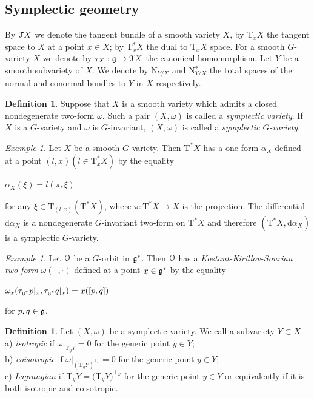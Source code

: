 \documentclass[12pt]{amsart}
\theoremstyle{definition}\newtheorem{theorem}{Theorem}[section]
\theoremstyle{definition}\newtheorem{definition}[proposition]{Definition}
\theoremstyle{remark}\newtheorem{example}[proposition]{Example}
\renewcommand{\to}[1][]{\xrightarrow{#1}}
\begin{document}
\subsection{Symplectic geometry}\label{Sssg} By $\EuScript TX$ we denote the tangent bundle  of a smooth variety $X$, by T$_xX$ the tangent space to $X$ at a point $x\in X$; by T$^*_xX$ the dual to T$_xX$ space. For a smooth $G$-variety $X$ we denote by $\tau_X: \frak g\to\EuScript TX$ the canonical homomorphism. Let $Y$ be a smooth subvariety of $X$. We denote by N$_{Y/X}$ and N$_{Y/X}^*$ the total spaces of the normal and conormal bundles to $Y$ in $X$ respectively.
\begin{definition}\upshape Suppose that $X$ is a smooth variety which admits a closed nondegenerate two-form $\omega$. Such a pair $(X,\omega)$ is called a {\it symplectic variety}. If $X$ is a $G$-variety and $\omega$ is $G$-invariant, $(X, \omega)$ is called a {\it symplectic $G$-variety}.\end{definition}
\begin{example}\upshape Let $X$ be a smooth $G$-variety. Then $\mathrm T^*X$ has a one-form $\alpha_X$ defined at a point $(l,x) (l\in\mathrm T_x^*X)$ by the equality \begin{center}$\alpha_X(\xi)=l(\pi_*\xi)$\end{center} for any $\xi\in\mathrm T_{(l, x)}(\mathrm T^*X)$, where $\pi: \mathrm T^*X\to X$ is the projection. The differential $\mathrm d\alpha_X$ is a nondegenerate $G$-invariant two-form on $\mathrm T^*X$ and therefore $(\mathrm T^*X, \mathrm d\alpha_X)$ is a symplectic $G$-variety.\end{example}
\begin{example}\upshape Let $\EuScript O$ be a $G$-orbit in $\frak g^*$. Then $\EuScript O$ has a {\it{}Kostant-Kirillov-Souriau two-form } $\omega(\cdot~\!, \cdot)$ defined at a point $x\in\frak g^*$ by the equality\begin{center}$\omega_x(\tau_{\frak g^*}p|_x, \tau_{\frak g^*}q|_x)=x([p,q])$\end{center} for $p, q\in\frak g$.\end{example}
\begin{definition}\upshape Let $(X,\omega)$ be a symplectic variety. We call a subvariety $Y\subset X$\\a) {\it isotropic} if $\omega|_{\mathrm T_yY}=0$ for the generic point $y\in Y$;\\b) {\it coisotropic} if $\omega|_{(\mathrm T_yY)^{\bot_\omega}}=0$ for the generic point $y\in Y$;\\c) {\it Lagrangian} if T$_yY=($T$_yY)^{\bot_\omega}$ for the generic point $y\in Y$ or equivalently if it is both isotropic and coisotropic.\end{definition}
\end{document}
